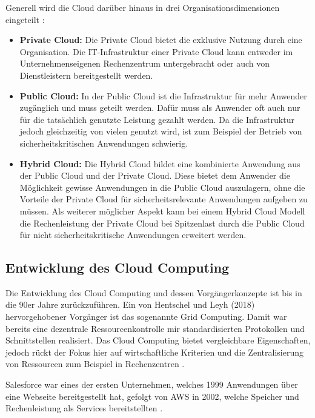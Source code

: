 Generell wird die Cloud darüber hinaus in drei Organisationsdimensionen eingeteilt \cite[Vgl. auch im Folgenden][S. 7ff]{Reinheimer2018}:
\begin{itemize}
\item \textbf{Private Cloud:} Die Private Cloud bietet die exklusive Nutzung durch eine Organisation. Die IT-Infrastruktur einer Private Cloud kann entweder im Unternehmenseigenen Rechenzentrum untergebracht oder auch von Dienstleistern bereitgestellt werden.
\item \textbf{Public Cloud:} In der Public Cloud ist die Infrastruktur für mehr Anwender zugänglich und muss geteilt werden. Dafür muss als Anwender oft auch nur für die tatsächlich genutzte Leistung gezahlt werden. Da die Infrastruktur jedoch gleichzeitig von vielen genutzt wird, ist zum Beispiel der Betrieb von sicherheitskritischen Anwendungen schwierig.
\item \textbf{Hybrid Cloud:} Die Hybrid Cloud bildet eine kombinierte Anwendung aus der Public Cloud und der Private Cloud. Diese bietet dem Anwender die Möglichkeit gewisse Anwendungen in die Public Cloud auszulagern, ohne die Vorteile der Private Cloud für sicherheitsrelevante Anwendungen aufgeben zu müssen. Als weiterer möglicher Aspekt kann bei einem Hybrid Cloud Modell die Rechenleistung der Private Cloud bei Spitzenlast durch die Public Cloud für nicht sicherheitskritische Anwendungen erweitert werden. 
\end{itemize} \pagebreak

\subsection{Entwicklung des Cloud Computing}

Die Entwicklung des Cloud Computing und dessen Vorgängerkonzepte ist bis in die 90er Jahre zurückzuführen. Ein von Hentschel und Leyh (2018) hervorgehobener Vorgänger ist das sogenannte Grid Computing. Damit war bereits eine dezentrale Ressourcenkontrolle mir standardisierten Protokollen und Schnittstellen realisiert. Das Cloud Computing bietet vergleichbare Eigenschaften, jedoch rückt der Fokus hier auf wirtschaftliche Kriterien und die Zentralisierung von Ressourcen zum Beispiel in Rechenzentren \cite[Vgl.][S. 5f]{Reinheimer2018}.

Salesforce war eines der ersten Unternehmen, welches 1999 Anwendungen über eine Webseite bereitgestellt hat, gefolgt von \ac{AWS} in 2002, welche Speicher und Rechenleistung als Services bereitstellten \cite[Vgl.][S. 17f]{Srivastava2018}.

